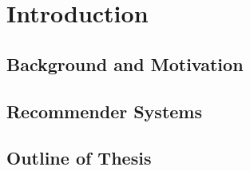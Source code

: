 \section{Introduction}

\subsection{Background and Motivation}
\subsection{Recommender Systems}
\subsection{Outline of Thesis}
